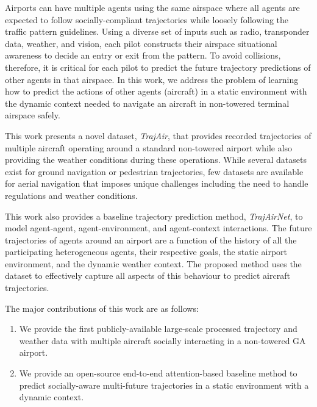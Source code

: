 \documentclass[letterpaper, 10 pt, conference]{ieeeconf}
\begin{document}
Airports can have multiple agents using the same airspace where all agents are expected to follow socially-compliant trajectories while loosely following the traffic pattern guidelines. Using a diverse set of inputs such as radio, transponder data, weather, and vision, each pilot constructs their airspace situational awareness  to decide an entry or exit from the pattern. To avoid collisions, therefore, it is critical for each pilot to predict the future trajectory predictions of other agents in that airspace.  
In this work, we address the problem of learning how to predict the actions of other agents (aircraft) in a static environment with the dynamic context needed to navigate an aircraft in non-towered terminal airspace safely.
 



 This work presents a novel dataset, \textit{TrajAir}, that provides recorded trajectories of multiple aircraft operating around a standard non-towered airport while also providing the weather conditions during these operations. While several datasets exist for ground navigation or pedestrian trajectories, few datasets are available for aerial navigation that imposes unique challenges including the need to handle regulations and weather conditions. 
 
 This work also provides a baseline trajectory prediction method, \textit{TrajAirNet}, to model agent-agent, agent-environment, and agent-context interactions. The future trajectories of agents around an airport are a function of the history of all the participating heterogeneous agents, their respective goals, the static airport environment, and the dynamic weather context. The proposed method uses the dataset to effectively capture all aspects of this behaviour to predict aircraft trajectories. 


 



The major contributions of this work are as follows:

\begin{enumerate}
    \item We provide the first publicly-available large-scale processed trajectory and weather data with multiple aircraft socially interacting in a non-towered GA airport.  
    \item We provide an open-source end-to-end attention-based baseline method to predict socially-aware multi-future trajectories in a static environment with a dynamic context. 
\end{enumerate}
\end{document}
